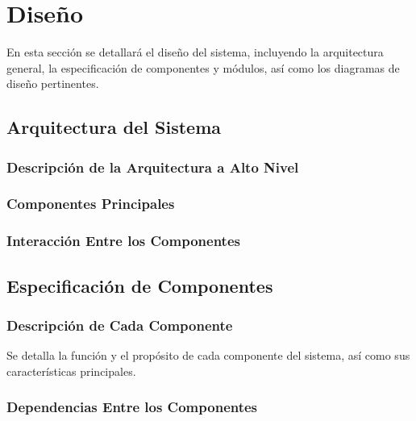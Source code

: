 \section{Diseño}

    En esta sección se detallará el diseño del sistema, incluyendo la arquitectura general, la especificación de componentes y módulos, así como los diagramas de diseño pertinentes.

    \subsection{Arquitectura del Sistema}

        \subsubsection{Descripción de la Arquitectura a Alto Nivel}

        \subsubsection{Componentes Principales}

        \subsubsection{Interacción Entre los Componentes}

    \subsection{Especificación de Componentes}

        \subsubsection{Descripción de Cada Componente}
        Se detalla la función y el propósito de cada componente del sistema, así como sus características principales.

        \subsubsection{Dependencias Entre los Componentes}

